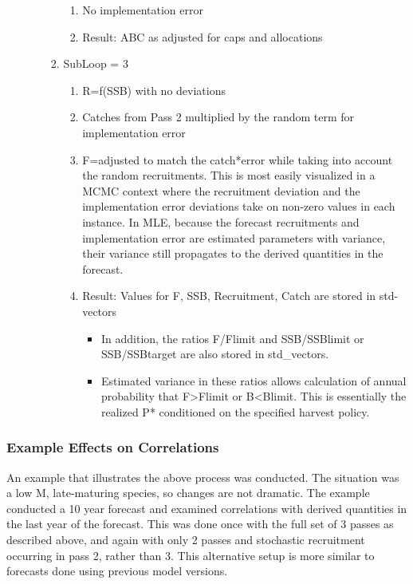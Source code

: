 \begin{enumerate}
\begin{enumerate}
\begin{enumerate}
\begin{enumerate}
				\item No implementation error
				\item Result: ABC as adjusted for caps and allocations
			\end{enumerate}
			\item SubLoop = 3
			\begin{enumerate}
				\item R=f(SSB) with no deviations
				\item Catches from Pass 2 multiplied by the random term for implementation error
				\item F=adjusted to match the catch*error while taking into account the random recruitments.  This is most easily visualized in a MCMC context where the recruitment deviation and the implementation error deviations take on non-zero values in each instance.  In MLE, because the forecast recruitments and implementation error are estimated parameters with variance, their variance still propagates to the derived quantities in the forecast.
				\item Result:  Values for F, SSB, Recruitment, Catch are stored in std-vectors
				\begin{itemize}
					\item In addition, the ratios F/Flimit and SSB/SSBlimit or SSB/SSBtarget are also stored in std\_vectors.
					\item Estimated variance in these ratios allows calculation of annual probability that F>Flimit or B<Blimit.  This is essentially the realized P* conditioned on the specified harvest policy.
				\end{itemize}
			\end{enumerate}
		\end{enumerate}
	\end{enumerate}
\end{enumerate}

\subsubsection{Example Effects on Correlations}
An example that illustrates the above process was conducted.  The situation was a low M, late-maturing species, so changes are not dramatic.  The example conducted a 10 year forecast and examined correlations with derived quantities in the last year of the forecast.  This was done once with the full set of 3 passes as described above, and again with only 2 passes and stochastic recruitment occurring in pass 2, rather than 3.  This alternative setup is more similar to forecasts done using previous model versions.

